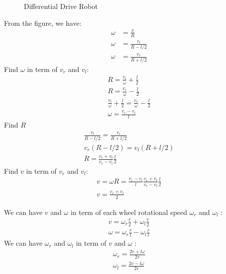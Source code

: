 \begin{figure}[ht]
	\centering
	
	\caption{Differential Drive Robot}
\end{figure}
From the figure, we have:
\begin{equation}
	\begin{split}
		\omega &= \frac{v}{R}\\
		\omega &= \frac{v_l}{R-l/2}\\
		\omega &= \frac{v_r}{R+l/2}
	\end{split}
\end{equation}
Find $\omega$ in term of $v_r$ and $v_l$:
\begin{equation}
	\begin{split}
		R = \frac{v_l}{\omega} + \frac{l}{2}\\
		R = \frac{v_r}{\omega} - \frac{l}{2}\\
		\frac{v_l}{\omega} + \frac{l}{2} = \frac{v_r}{\omega} - \frac{l}{2}\\
		\omega = \frac{v_r - v_l}{l}
	\end{split}
\end{equation}
Find $R$
\begin{equation}
	\begin{split}
		\frac{v_l}{R-l/2} = \frac{v_r}{R+l/2}\\
		v_r(R-l/2) = v_l(R+l/2) \\
		R = \frac{v_r + v_l}{v_r - v_l}\frac{l}{2}
	\end{split}
\end{equation}
Find $v$ in term of $v_r$ and $v_l$:
\begin{equation}
	\begin{split}
		v = \omega R = \frac{v_r - v_l}{l} \frac{v_r + v_l}{v_r - v_l}\frac{l}{2}\\
		v = \frac{v_r+v_l}{2}
	\end{split}
\end{equation}
\begin{tcolorbox}[title={Relation of $v,\omega$ with $\omega_l,\omega_r$}]
	We can have $v$ and $\omega$ in term of each wheel rotational speed $\omega_r$ and $\omega_l$ :
	\begin{equation}
		\begin{split}
			v = \omega_r\frac{r}{2} + \omega_l\frac{r}{2}\\
			\omega = \omega_r\frac{r}{l} - \omega_l\frac{r}{l}
		\end{split}
	\end{equation}
	We can have $\omega_r$ and $\omega_l$ in term of $v$ and $\omega$ : 
	\begin{equation}
		\begin{split}
			\omega_r = \frac{2v+l\omega}{2r}\\
			\omega_l = \frac{2v-l\omega}{2r}
		\end{split}
	\end{equation}
\end{tcolorbox}
